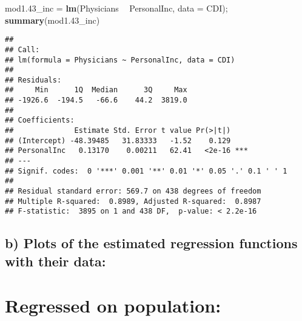 \documentclass[]{article}
\newenvironment{Shaded}{\begin{snugshade}}{\end{snugshade}}
\newcommand{\DataTypeTok}[1]{\textcolor[rgb]{0.13,0.29,0.53}{#1}}
\newcommand{\DecValTok}[1]{\textcolor[rgb]{0.00,0.00,0.81}{#1}}
\newcommand{\FloatTok}[1]{\textcolor[rgb]{0.00,0.00,0.81}{#1}}
\newcommand{\KeywordTok}[1]{\textcolor[rgb]{0.13,0.29,0.53}{\textbf{#1}}}
\newcommand{\NormalTok}[1]{#1}
\newcommand{\OperatorTok}[1]{\textcolor[rgb]{0.81,0.36,0.00}{\textbf{#1}}}
\newcommand{\StringTok}[1]{\textcolor[rgb]{0.31,0.60,0.02}{#1}}
\begin{document}
\begin{Shaded}
\begin{Highlighting}[]
\NormalTok{mod1}\FloatTok{.43}\NormalTok{_inc =}\StringTok{ }\KeywordTok{lm}\NormalTok{(Physicians }\OperatorTok{~}\StringTok{ }\NormalTok{PersonalInc, }\DataTypeTok{data =}\NormalTok{ CDI); }\KeywordTok{summary}\NormalTok{(mod1}\FloatTok{.43}\NormalTok{_inc)}
\end{Highlighting}
\end{Shaded}

\begin{verbatim}
## 
## Call:
## lm(formula = Physicians ~ PersonalInc, data = CDI)
## 
## Residuals:
##     Min      1Q  Median      3Q     Max 
## -1926.6  -194.5   -66.6    44.2  3819.0 
## 
## Coefficients:
##              Estimate Std. Error t value Pr(>|t|)    
## (Intercept) -48.39485   31.83333   -1.52    0.129    
## PersonalInc   0.13170    0.00211   62.41   <2e-16 ***
## ---
## Signif. codes:  0 '***' 0.001 '**' 0.01 '*' 0.05 '.' 0.1 ' ' 1
## 
## Residual standard error: 569.7 on 438 degrees of freedom
## Multiple R-squared:  0.8989, Adjusted R-squared:  0.8987 
## F-statistic:  3895 on 1 and 438 DF,  p-value: < 2.2e-16
\end{verbatim}

\hypertarget{b-plots-of-the-estimated-regression-functions-with-their-data}{%
\subsection{b) Plots of the estimated regression functions with their
data:}\label{b-plots-of-the-estimated-regression-functions-with-their-data}}

\hypertarget{regressed-on-population}{%
\section{Regressed on population:}\label{regressed-on-population}}

\begin{Shaded}
\end{Shaded}
\end{document}

